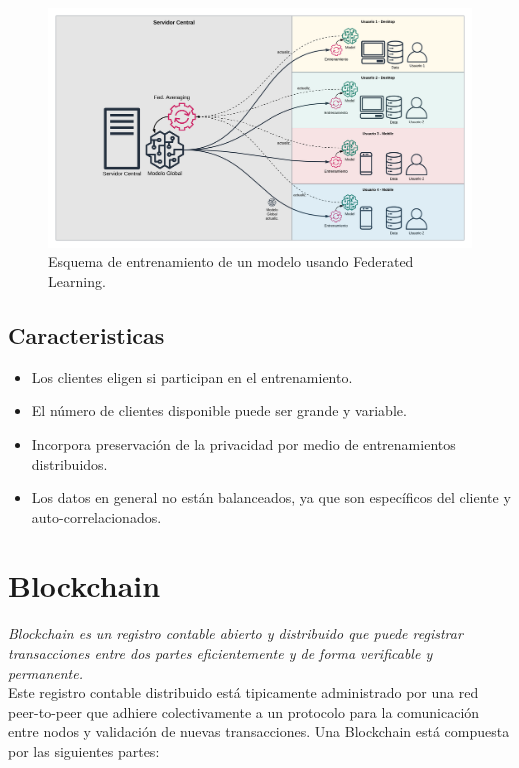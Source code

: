 \documentclass[
11pt, %
oneside, %
spanish, %
singlespacing, %
parskip, %
headsepline, %
chapterinoneline, %
]{MastersDoctoralThesis} %
\begin{document}
\begin{figure}[H]
  	\centering
	\includegraphics[scale=0.42]{imgs/fl_flow.png}
	\caption{Esquema de entrenamiento de un modelo usando Federated Learning.}
\end{figure}

\subsection*{Caracteristicas}
\begin{itemize}
\item Los clientes eligen si participan en el entrenamiento. 
\item El número de clientes disponible puede ser grande y variable.
\item Incorpora preservación de la privacidad por medio de entrenamientos distribuidos.
\item Los datos en general no están balanceados, ya que son específicos del cliente y auto-correlacionados.
\end{itemize}


\section{Blockchain}

\textit{Blockchain es un registro contable abierto y distribuido que puede registrar transacciones entre dos partes eficientemente y de forma verificable y permanente.}\cite{bc-def} \\

Este registro contable distribuido está tipicamente administrado por una red peer-to-peer que adhiere colectivamente a un protocolo para la comunicación entre nodos y validación de nuevas transacciones.
Una Blockchain está compuesta por las siguientes partes:
\end{document}
